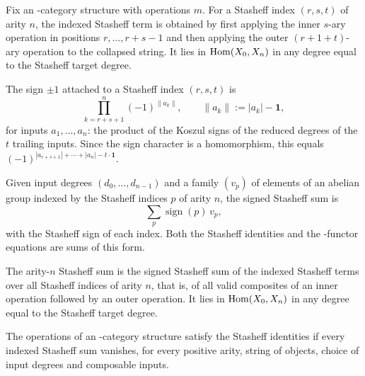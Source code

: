 \begin{definition}
\label{AInfinityTheory.stasheffTerm}
\leanok
{}
Fix an \Ainf{}-category structure with operations $m$. For a Stasheff index $(r,s,t)$ of arity $n$, the
indexed Stasheff term is obtained by first applying the inner $s$-ary operation in
positions $r,\dots,r+s-1$ and then applying the outer $(r+1+t)$-ary operation to
the collapsed string. It lies in $\operatorname{Hom}(X_0,X_n)$ in any degree equal to the
Stasheff target degree.
\end{definition}

\begin{definition}
\label{AInfinityTheory.stasheffSign}
\leanok
{}
The sign $\pm 1$ attached to a Stasheff index $(r,s,t)$ is
\[
  \prod_{k=r+s+1}^{n} (-1)^{\|a_k\|},
  \qquad
  \|a_k\| := |a_k| - \mathbf{1},
\]
for inputs $a_1,\dots,a_n$: the product of the Koszul signs of the reduced degrees of
the $t$ trailing inputs. Since the sign character is a homomorphism, this equals
$(-1)^{|a_{r+s+1}| + \cdots + |a_n| - t \cdot \mathbf{1}}$.
\end{definition}

\begin{definition}
\label{AInfinityTheory.signedStasheffSum}
\leanok
{}
Given input degrees $(d_0,\dots,d_{n-1})$ and a family $(v_p)$ of elements of an
abelian group indexed by the Stasheff indices $p$ of arity $n$, the signed Stasheff
sum is
\[
  \sum_{p} \operatorname{sign}(p)\, v_p,
\]
with the Stasheff sign of each index. Both the Stasheff identities and the
\Ainf{}-functor equations are sums of this form.
\end{definition}

\begin{definition}
\label{AInfinityTheory.stasheffSum}
\leanok
{}
The arity-$n$ Stasheff sum is the signed Stasheff sum of the indexed Stasheff terms
over all Stasheff indices of arity $n$, that is, of all valid composites of an inner
operation followed by an outer operation. It lies in $\operatorname{Hom}(X_0,X_n)$ in any degree
equal to the Stasheff target degree.
\end{definition}

\begin{definition}
\label{AInfinityTheory.AInfinityCategory.stasheffSum_eq_zero}
\leanok
{}
The operations of an \Ainf{}-category structure satisfy the Stasheff identities if every
indexed Stasheff sum vanishes, for every positive arity, string of objects, choice of
input degrees and composable inputs.
\end{definition}
